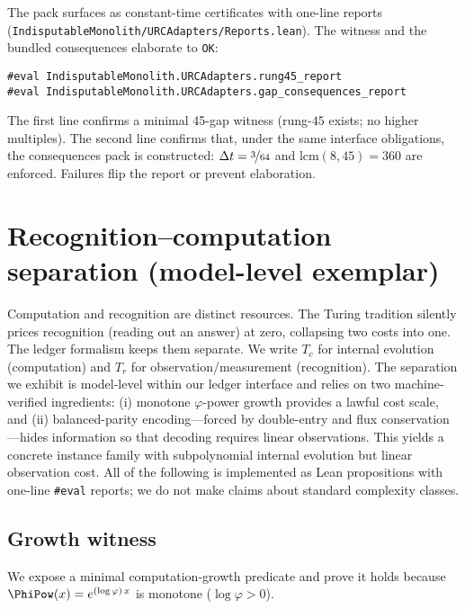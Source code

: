 \documentclass[11pt,a4paper,twoside]{article}
\numberwithin{equation}{section}
\theoremstyle{customthm}
\theoremstyle{customdef}
\theoremstyle{customrem}
\begin{document}
The pack surfaces as constant-time certificates with one-line reports (\texttt{IndisputableMonolith/URCAdapters/Reports.lean}). The witness and the bundled consequences elaborate to \texttt{OK}:

\begin{lstlisting}
#eval IndisputableMonolith.URCAdapters.rung45_report
#eval IndisputableMonolith.URCAdapters.gap_consequences_report
\end{lstlisting}

\begin{resultbox}[Meaning]
The first line confirms a minimal 45-gap witness (rung-$45$ exists; no higher multiples). The second line confirms that, under the same interface obligations, the consequences pack is constructed: $\Delta t=\nicefrac{3}{64}$ and $\mathrm{lcm}(8,45)=360$ are enforced. Failures flip the report or prevent elaboration.
\end{resultbox}

\section{Recognition–computation separation (model-level exemplar)}\label{sec:pn-split}

Computation and recognition are distinct resources. The Turing tradition silently prices recognition (reading out an answer) at zero, collapsing two costs into one. The ledger formalism keeps them separate. We write \(T_c\) for internal evolution (computation) and \(T_r\) for observation/measurement (recognition). The separation we exhibit is model-level within our ledger interface and relies on two machine-verified ingredients: (i) monotone \(\varphi\)-power growth provides a lawful cost scale, and (ii) balanced-parity encoding—forced by double-entry and flux conservation—hides information so that decoding requires linear observations. This yields a concrete instance family with subpolynomial internal evolution but linear observation cost. All of the following is implemented as Lean propositions with one-line \texttt{\#eval} reports; we do not make claims about standard complexity classes.

\subsection{Growth witness}\label{subsec:pn-growth}

We expose a minimal computation-growth predicate and prove it holds because \(\PhiPow(x)=e^{(\log \varphi)\,x}\) is monotone (\(\log\varphi>0\)).
\end{document}
